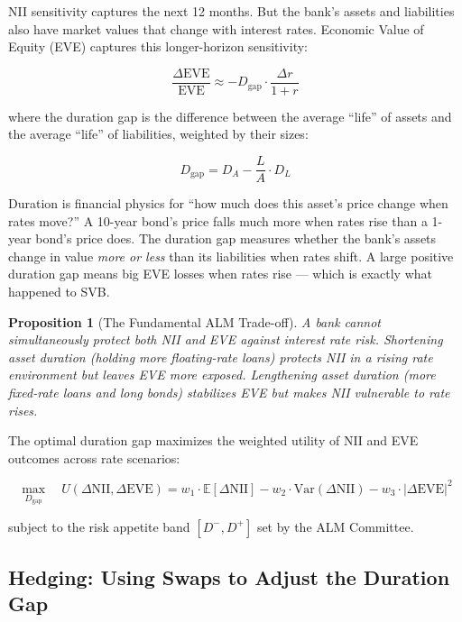 \documentclass[12pt,a4paper]{article}
\newcommand{\E}{\mathbb{E}}
\newtheorem{proposition}{Proposition}
\begin{document}
NII sensitivity captures the next 12 months.  But the bank's assets and
liabilities also have market values that change with interest rates.
Economic Value of Equity (EVE) captures this longer-horizon sensitivity:

\begin{equation}
  \frac{\Delta\text{EVE}}{\text{EVE}} \approx -D_{\text{gap}} \cdot \frac{\Delta r}{1 + r}
\end{equation}

where the duration gap is the difference between the average ``life'' of
assets and the average ``life'' of liabilities, weighted by their sizes:

\begin{equation}
  D_{\text{gap}} = D_A - \frac{L}{A} \cdot D_L
\end{equation}

\begin{mdframed}[style=analogy]
Duration is financial physics for ``how much does this asset's price change
when rates move?''  A 10-year bond's price falls much more when rates rise
than a 1-year bond's price does.  The duration gap measures whether the bank's
assets change in value \emph{more or less} than its liabilities when rates
shift.  A large positive duration gap means big EVE losses when rates rise ---
which is exactly what happened to SVB.
\end{mdframed}

\begin{proposition}[The Fundamental ALM Trade-off]
A bank cannot simultaneously protect both NII and EVE against interest rate
risk.  Shortening asset duration (holding more floating-rate loans) protects
NII in a rising rate environment but leaves EVE more exposed.  Lengthening
asset duration (more fixed-rate loans and long bonds) stabilizes EVE but
makes NII vulnerable to rate rises.
\end{proposition}

The optimal duration gap maximizes the weighted utility of NII and EVE
outcomes across rate scenarios:

\begin{equation}
  \max_{D_{\text{gap}}} \quad U(\Delta\text{NII}, \Delta\text{EVE})
  = w_1 \cdot \E[\Delta\text{NII}] - w_2 \cdot \text{Var}(\Delta\text{NII})
    - w_3 \cdot |\Delta\text{EVE}|^2
\end{equation}

subject to the risk appetite band $[D^-, D^+]$ set by the ALM Committee.

\subsection{Hedging: Using Swaps to Adjust the Duration Gap}
\end{document}
